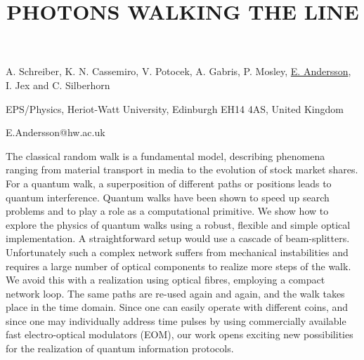 \title{PHOTONS WALKING THE LINE}

A. Schreiber, K. N. Cassemiro, V. Potocek, A. Gabris, P. Mosley, \underline{E. Andersson}, I. Jex and C. Silberhorn

{\normalsize{\vspace{-4mm}
EPS/Physics, Heriot-Watt University, Edinburgh EH14 4AS, United Kingdom

\email E.Andersson@hw.ac.uk}}

The classical random walk is a fundamental model, describing phenomena ranging from material transport in media to the
evolution of stock market shares. For a quantum walk, a superposition of different paths or positions leads to quantum
interference. Quantum walks have been shown to speed up search problems and to play a role as a computational primitive. We
show how to explore the physics of quantum walks using a robust, flexible and simple optical implementation. A straightforward
setup would use a cascade of beam-splitters. Unfortunately such a complex network suffers from mechanical instabilities and
requires a large number of optical components to realize more steps of the walk. We avoid this with a realization using optical
fibres, employing a compact network loop. The same paths are re-used again and again, and the walk takes place in the time
domain. Since one can easily operate with different coins, and since one may individually address time pulses by using
commercially available fast electro-optical modulators (EOM), our work opens exciting new possibilities for the realization of
quantum information protocols.

\vspace{\baselineskip} 